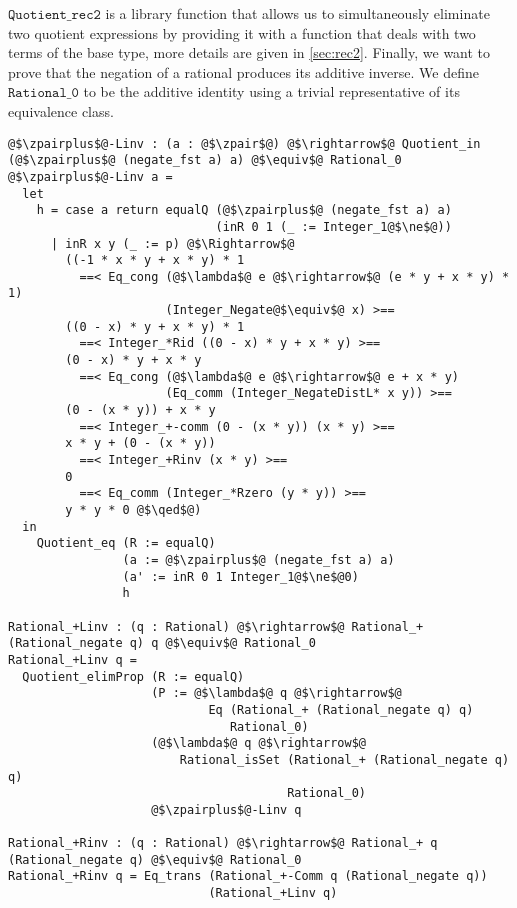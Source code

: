 \documentclass[12pt,twoside,maitrise]{dms}
\theoremstyle{definition}
\numberwithin{equation}{section}
\numberwithin{table}{chapter}
\numberwithin{figure}{chapter}
\newcommand\id[1] {\texttt{#1}}
\renewcommand\qed{\blacksquare}
\begin{document}
$\id{Quotient\_rec2}$ is a library function that allows us to simultaneously
eliminate two quotient expressions by providing it with a function that deals
with two terms of the base type, more details are given in \autoref{sec:rec2}.
Finally, we want to prove that the negation of a rational produces its additive
inverse. We define $\id{Rational\_0}$ to be the additive identity using a
trivial representative of its equivalence class.

\begin{verbatim}
@$\zpairplus$@-Linv : (a : @$\zpair$@) @$\rightarrow$@ Quotient_in (@$\zpairplus$@ (negate_fst a) a) @$\equiv$@ Rational_0
@$\zpairplus$@-Linv a =
  let
    h = case a return equalQ (@$\zpairplus$@ (negate_fst a) a)
                             (inR 0 1 (_ := Integer_1@$\ne$@))
      | inR x y (_ := p) @$\Rightarrow$@
        ((-1 * x * y + x * y) * 1
          ==< Eq_cong (@$\lambda$@ e @$\rightarrow$@ (e * y + x * y) * 1)
                      (Integer_Negate@$\equiv$@ x) >==
        ((0 - x) * y + x * y) * 1
          ==< Integer_*Rid ((0 - x) * y + x * y) >==
        (0 - x) * y + x * y
          ==< Eq_cong (@$\lambda$@ e @$\rightarrow$@ e + x * y)
                      (Eq_comm (Integer_NegateDistL* x y)) >==
        (0 - (x * y)) + x * y
          ==< Integer_+-comm (0 - (x * y)) (x * y) >==
        x * y + (0 - (x * y))
          ==< Integer_+Rinv (x * y) >==
        0
          ==< Eq_comm (Integer_*Rzero (y * y)) >==
        y * y * 0 @$\qed$@)
  in
    Quotient_eq (R := equalQ)
                (a := @$\zpairplus$@ (negate_fst a) a)
                (a' := inR 0 1 Integer_1@$\ne$@0)
                h

Rational_+Linv : (q : Rational) @$\rightarrow$@ Rational_+ (Rational_negate q) q @$\equiv$@ Rational_0
Rational_+Linv q =
  Quotient_elimProp (R := equalQ)
                    (P := @$\lambda$@ q @$\rightarrow$@
                            Eq (Rational_+ (Rational_negate q) q)
                               Rational_0)
                    (@$\lambda$@ q @$\rightarrow$@
                        Rational_isSet (Rational_+ (Rational_negate q) q)
                                       Rational_0)
                    @$\zpairplus$@-Linv q

Rational_+Rinv : (q : Rational) @$\rightarrow$@ Rational_+ q (Rational_negate q) @$\equiv$@ Rational_0
Rational_+Rinv q = Eq_trans (Rational_+-Comm q (Rational_negate q))
                            (Rational_+Linv q)

\end{verbatim}
\end{document}
